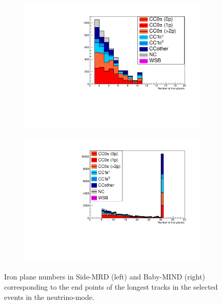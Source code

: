 \begin{figure}[tbh]
  \begin{center}
   \begin{subfigure}{0.48\textwidth}
     \includegraphics[width=0.8\linewidth, angle=270]{fig/FHCMuonPenetration_SideMRD_StoppedOrThroughGoing.pdf}
    \end{subfigure}
  \begin{subfigure}{0.48\textwidth}
      \includegraphics[width=0.8\linewidth, angle=270]{fig/FHCMuonPenetration_DownstreamMRD_StoppedOrThroughGoing.pdf}
    \end{subfigure}    
    \end{center}
  \caption{
Iron plane numbers in Side-MRD (left) and Baby-MIND (right) corresponding to the end points of the longest tracks in the selected events in the neutrino-mode.
}
\label{fig:endpoint_longest_track_neutrino}
\end{figure}

